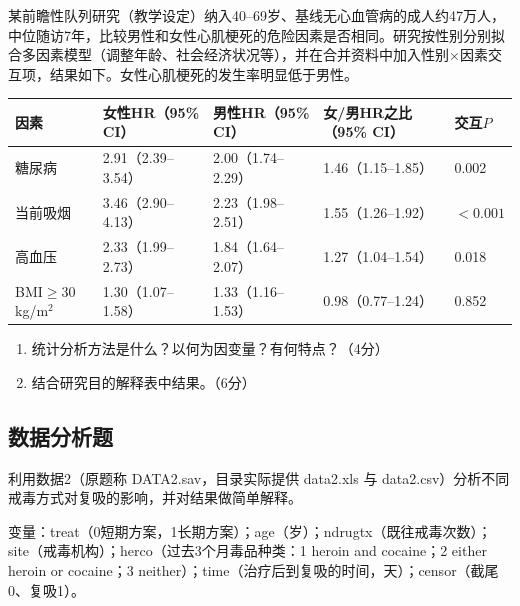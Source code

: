 \par\addvspace{8pt}\noindent\begin{minipage}{\linewidth}


某前瞻性队列研究（教学设定）纳入40--69岁、基线无心血管病的成人约47万人，中位随访7年，比较男性和女性心肌梗死的危险因素是否相同。研究按性别分别拟合多因素模型（调整年龄、社会经济状况等），并在合并资料中加入性别\(\times\)因素交互项，结果如下。女性心肌梗死的发生率明显低于男性。

\begin{center}\small\setlength{\tabcolsep}{4pt}\renewcommand{\arraystretch}{1.22}\begin{tabular}{@{}lllll@{}}
\toprule
因素 & 女性HR（95\% CI） & 男性HR（95\% CI） & 女/男HR之比（95\% CI） & 交互\(P\) \\
\midrule
糖尿病 & 2.91（2.39--3.54） & 2.00（1.74--2.29） & 1.46（1.15--1.85） & 0.002 \\
当前吸烟 & 3.46（2.90--4.13） & 2.23（1.98--2.51） & 1.55（1.26--1.92） & \(<0.001\) \\
高血压 & 2.33（1.99--2.73） & 1.84（1.64--2.07） & 1.27（1.04--1.54） & 0.018 \\
BMI\(\ge30\) kg/m\(^2\) & 1.30（1.07--1.58） & 1.33（1.16--1.53） & 0.98（0.77--1.24） & 0.852 \\
\bottomrule\end{tabular}\end{center}

\begin{enumerate}
\def\labelenumi{\arabic{enumi}.}
\tightlist
\item
  统计分析方法是什么？以何为因变量？有何特点？（4分）
\item
  结合研究目的解释表中结果。（6分）
\end{enumerate}


\end{minipage}\par\vspace{5pt}

\par\addvspace{8pt}\noindent\begin{minipage}{\linewidth}

\subsection{数据分析题}


利用数据2（原题称 DATA2.sav，目录实际提供 data2.xls 与 data2.csv）分析不同戒毒方式对复吸的影响，并对结果做简单解释。

变量：treat（0短期方案，1长期方案）；age（岁）；ndrugtx（既往戒毒次数）；site（戒毒机构）；herco（过去3个月毒品种类：1 heroin and cocaine；2 either heroin or cocaine；3 neither）；time（治疗后到复吸的时间，天）；censor（截尾0、复吸1）。



\end{minipage}\par\vspace{5pt}

